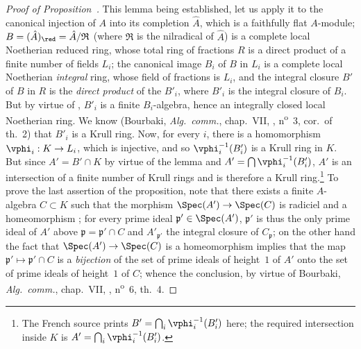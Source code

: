 \begin{proof}[Proof of Proposition~{\rm{}}]
This lemma being established, let us apply it to the canonical injection of $A$ into its completion $\hat{A}$, which is a faithfully flat $A$-module; $B=(\hat{A})_\red=\hat{A}/\mathfrak{R}$ (where $\mathfrak{R}$ is the nilradical of $\hat{A}$) is a complete local Noetherian reduced ring, whose total ring of
fractions $R$ is a direct product of a finite number of fields $L_i$; the canonical image $B_i$ of $B$ in $L_i$ is a complete local Noetherian \emph{integral} ring, whose field of fractions is $L_i$, and the integral closure $B'$ of $B$ in $R$ is the \emph{direct product} of the $B'_i$, where $B'_i$ is the integral closure of $B_i$.
But by virtue of , $B'_i$ is a finite $B_i$-algebra, hence an integrally closed local Noetherian ring.
We know (Bourbaki, \emph{Alg.~comm.}, chap.~VII, , n\textsuperscript{o}~3, cor.~of th.~2) that $B'_i$ is a Krull ring.
Now, for every $i$, there is a homomorphism $\vphi_i:K\to L_i$, which is injective, and so $\vphi_i^{-1}(B'_i)$ is a Krull ring in $K$.
But since $A'=B'\cap K$ by virtue of the lemma and $A'=\bigcap\vphi_i^{-1}(B'_i)$, $A'$ is an intersection of a finite number of Krull rings and is therefore a Krull ring.\footnote{The French source prints $B'=\bigcap_i\vphi_i^{-1}(B'_i)$ here; the required intersection inside $K$ is $A'=\bigcap_i\vphi_i^{-1}(B'_i)$.}
To prove the last assertion of the proposition, note that there exists a finite $A$-algebra $C\subset K$ such that the morphism $\Spec(A')\to\Spec(C)$ is radiciel and a homeomorphism ; for every prime ideal $\mathfrak{p}'\in\Spec(A')$, $\mathfrak{p}'$ is thus the only prime ideal of $A'$ above $\mathfrak{p}=\mathfrak{p}'\cap C$ and $A'_{\mathfrak{p}'}$ the integral closure of $C_\mathfrak{p}$; on the other hand the fact that $\Spec(A')\to\Spec(C)$ is a homeomorphism implies that the map $\mathfrak{p}'\mapsto\mathfrak{p}'\cap C$ is a \emph{bijection} of the set of prime ideals of height~$1$ of $A'$ onto the set of prime ideals of height~$1$ of $C$; whence the conclusion, by virtue of Bourbaki, \emph{Alg.~comm.}, chap.~VII, , n\textsuperscript{o}~6, th.~4.
\end{proof}

